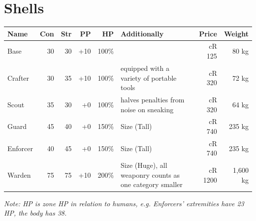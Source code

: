 \documentclass[12pt,a4paper,openany,usenames,dvipsnames]{book}
\begin{document}
	\section{Shells}
	\begin{tabularx}{\textwidth}{|l|r|r|r|r|X|r|r|}
		\hline
		Name & Con & Str & PP & HP & Additionally & Price & Weight \\ \hline
		Base & 30 & 30 & +10 & 100\% & & cR 125 & 80 kg \\ \hline
		Crafter & 30 & 35 & +10 & 100\% & equipped with a variety of portable tools & cR 320 & 72 kg \\ \hline
		Scout & 35 & 30 & +0 & 100\% & halves penalties from noise on sneaking & cR 320 & 64 kg \\ \hline
		Guard & 45 & 40 & +0 & 150\% & Size (Tall) & cR 740 & 235 kg \\ \hline
		Enforcer & 40 & 45 & +0 & 150\% & Size (Tall) & cR 740 & 235 kg \\ \hline
		Warden & 75 & 75 & +10 & 200\% & Size (Huge), all weaponry counts as one category smaller & cR 1200 & 1,600 kg \\ \hline
	\end{tabularx}
	\par \vspace{-8mm}
	\textit{Note: HP is zone HP in relation to humans, e.g. Enforcers' extremities have 23 HP, the body has 38.}

\end{document}
